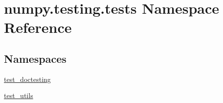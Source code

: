 \hypertarget{namespacenumpy_1_1testing_1_1tests}{}\section{numpy.\+testing.\+tests Namespace Reference}
\label{namespacenumpy_1_1testing_1_1tests}
\subsection*{Namespaces}
\begin{DoxyCompactItemize}
\item 
 \hyperlink{namespacenumpy_1_1testing_1_1tests_1_1test__doctesting}{test\+\_\+doctesting}
\item 
 \hyperlink{namespacenumpy_1_1testing_1_1tests_1_1test__utils}{test\+\_\+utils}
\end{DoxyCompactItemize}
